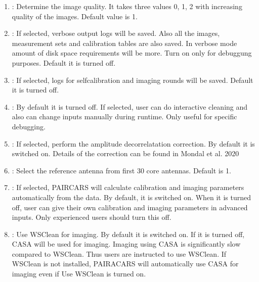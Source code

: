 \documentclass[letterpaper,10pt,english]{sphinxmanual}
\begin{document}
\begin{enumerate}
\item {} 
\sphinxAtStartPar
{} : Determine the image quality. It takes three values 0, 1, 2 with increasing quality of the images. Default value is 1.

\item {} 
\sphinxAtStartPar
{} : If selected, verbose output logs will be saved. Also all the images, measurement sets and calibration tables are also saved. In verbose mode amount of disk space requirements will be more. Turn on only for debuggung purposes. Default it is turned off.

\item {} 
\sphinxAtStartPar
{} : If selected, logs for self\sphinxhyphen{}calibration and imaging rounds will be saved. Default it is turned off.

\item {} 
\sphinxAtStartPar
{} : By default it is turned off. If selected, user can do interactive cleaning and also can change inputs manually during runtime. Only useful for specific debugging.

\item {} 
\sphinxAtStartPar
{} : If selected, perform the amplitude decorrelatation correction. By default it is switched on. Details of the correction can be found in Mondal et al. 2020 

\item {} 
\sphinxAtStartPar
{} : Select the reference antenna from first 30 core antennas. Default is 1.

\item {} 
\sphinxAtStartPar
{} : If selected, P\sphinxhyphen{}AIRCARS will calculate calibration and imaging parameters automatically from the data. By default, it is switched on. When it is turned off, user can give their own calibration and imaging parameters in advanced inputs. Only experienced users should turn this off.

\item {} 
\sphinxAtStartPar
{} :  Use WSClean for imaging. By default it is switched on. If it is turned off, CASA will be used for imaging. Imaging using CASA is significantly slow compared to WSClean. Thus users are instructed to use WSClean. If WSClean is not installed, P\sphinxhyphen{}AIRACARS will automatically use CASA for imaging even if Use WSClean is turned on.


\end{enumerate}
\end{document}

